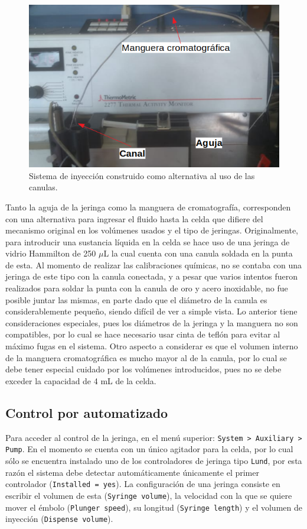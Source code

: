	\begin{figure}[h]
		\centering
		\includegraphics[width=0.6\linewidth]{Figures/sistemaInyeccion}
		
		\caption{Sistema de inyección construido como alternativa al uso de las canulas.}
		\label{fig: sistemaInyeccion}
	\end{figure}
	
	Tanto la aguja de la jeringa como la manguera de cromatografía, corresponden con una alternativa para ingresar el fluido hasta la celda que difiere del mecanismo original en los volúmenes usados y el tipo de jeringas. Originalmente, para introducir una sustancia l\'iquida en la celda se hace uso de una jeringa de vidrio Hammilton de 250 $\mu$L la cual cuenta con una canula soldada en la punta de esta. Al momento de realizar las calibraciones qu\'imicas, no se contaba con una jeringa de este tipo con la canula conectada, y a pesar que varios intentos fueron realizados para soldar la punta con la canula de oro y acero inoxidable, no fue posible juntar las mismas, en parte dado que el diámetro de la canula es considerablemente pequeño, siendo difícil de ver a simple vista. Lo anterior tiene consideraciones especiales, pues los diámetros de la jeringa y la manguera no son compatibles, por lo cual se hace necesario usar cinta de teflón para evitar al máximo fugas en el sistema. Otro aspecto a considerar es que el volumen interno de la manguera cromatogr\'afica es mucho mayor al de la canula, por lo cual se debe tener especial cuidado por los volúmenes introducidos, pues no se debe exceder la capacidad de 4 mL de la celda.
	
	\subsection{Control por automatizado}\label{ssec: jeringa}
	Para acceder al control de la jeringa, en el menú superior: \texttt{System > Auxiliary > Pump}. En el momento se cuenta con un único agitador para la celda, por lo cual sólo se encuentra instalado uno de los controladores de jeringa tipo \texttt{Lund}, por esta razón el sistema debe detectar automáticamente únicamente el primer controlador (\texttt{Installed = yes}). La configuración de una jeringa consiste en escribir el volumen de esta (\texttt{Syringe volume}), la velocidad con la que se quiere mover el émbolo (\texttt{Plunger speed}), su longitud (\texttt{Syringe length}) y el volumen de inyección (\texttt{Dispense volume}).
	
